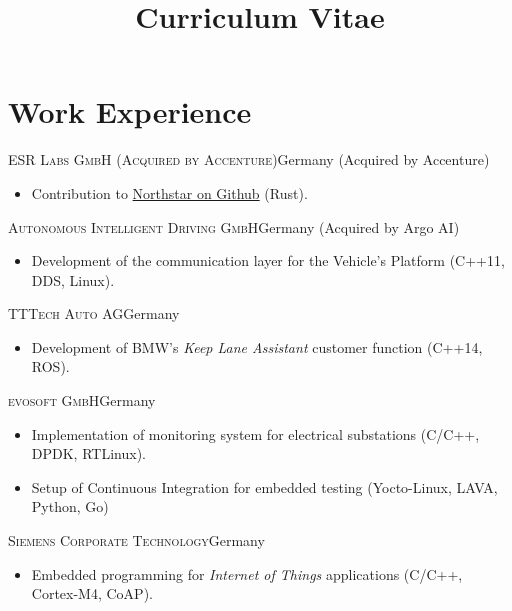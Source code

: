 \documentclass[10pt]{moderncv}
\title{Curriculum Vitae}
\begin{document}
\maketitle

\section{Work Experience}

{\textsc{ESR Labs GmbH (Acquired by Accenture)}}{Germany \newline (Acquired by
Accenture)}{}{%
\begin{itemize}
    \item Contribution to \href{https://github.com/esrlabs/northstar}{Northstar
        on Github} (Rust).
\end{itemize}
}

{\textsc{Autonomous Intelligent Driving GmbH}}{Germany \newline (Acquired by Argo AI)}{}{%
\begin{itemize}
  \item Development of the communication layer for the Vehicle's Platform
    (C++11, DDS, Linux).
\end{itemize}
}

{\textsc{TTTech Auto AG}}{Germany}{}{%
\begin{itemize}
  \item Development of BMW's \textit{Keep Lane Assistant}
    customer function (C++14, ROS).
\end{itemize}
}

{\textsc{evosoft GmbH}}{Germany}{}{%
\begin{itemize}
  \item Implementation of monitoring system for electrical substations
    (C/C++, DPDK, RTLinux).
  \item Setup of Continuous Integration for embedded testing (Yocto-Linux,
    LAVA, Python, Go)
\end{itemize}
}

{\textsc{Siemens Corporate Technology}}{Germany}{}{%
\begin{itemize}
  \item Embedded programming for \textit{Internet of Things} applications (C/C++, Cortex-M4, CoAP).
\end{itemize}
}
\end{document}
